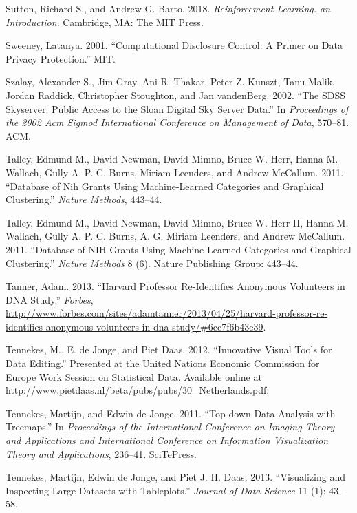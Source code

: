 \documentclass[]{krantz}
\begin{document}
\hypertarget{ref-Sutton2018}{}
Sutton, Richard S., and Andrew G. Barto. 2018. \emph{Reinforcement
Learning. an Introduction}. Cambridge, MA: The MIT Press.

\hypertarget{ref-sweeney2001computational}{}
Sweeney, Latanya. 2001. ``Computational Disclosure Control: A Primer on
Data Privacy Protection.'' MIT.

\hypertarget{ref-szalay2002sdss}{}
Szalay, Alexander S., Jim Gray, Ani R. Thakar, Peter Z. Kunszt, Tanu
Malik, Jordan Raddick, Christopher Stoughton, and Jan vandenBerg. 2002.
``The SDSS Skyserver: Public Access to the Sloan Digital Sky Server
Data.'' In \emph{Proceedings of the 2002 Acm Sigmod International
Conference on Management of Data}, 570--81. ACM.

\hypertarget{ref-EdmundMTalley2011}{}
Talley, Edmund M., David Newman, David Mimno, Bruce W. Herr, Hanna M.
Wallach, Gully A. P. C. Burns, Miriam Leenders, and Andrew McCallum.
2011. ``Database of Nih Grants Using Machine-Learned Categories and
Graphical Clustering.'' \emph{Nature Methods}, 443--44.

\hypertarget{ref-talley2011database}{}
Talley, Edmund M., David Newman, David Mimno, Bruce W. Herr II, Hanna M.
Wallach, Gully A. P. C. Burns, A. G. Miriam Leenders, and Andrew
McCallum. 2011. ``Database of NIH Grants Using Machine-Learned
Categories and Graphical Clustering.'' \emph{Nature Methods} 8 (6).
Nature Publishing Group: 443--44.

\hypertarget{ref-forbesharvard}{}
Tanner, Adam. 2013. ``Harvard Professor Re-Identifies Anonymous
Volunteers in DNA Study.'' \emph{Forbes},
\url{http://www.forbes.com/sites/adamtanner/2013/04/25/harvard-professor-re-identifies-anonymous-volunteers-in-dna-study/\#6cc7f6b43e39}.

\hypertarget{ref-Tennekes2012}{}
Tennekes, M., E. de Jonge, and Piet Daas. 2012. ``Innovative Visual
Tools for Data Editing.'' Presented at the United Nations Economic
Commission for Europe Work Session on Statistical Data. Available online
at \url{http://www.pietdaas.nl/beta/pubs/pubs/30_Netherlands.pdf}.

\hypertarget{ref-tennekes2011top}{}
Tennekes, Martijn, and Edwin de Jonge. 2011. ``Top-down Data Analysis
with Treemaps.'' In \emph{Proceedings of the International Conference on
Imaging Theory and Applications and International Conference on
Information Visualization Theory and Applications}, 236--41. SciTePress.

\hypertarget{ref-tennekes2013visualizing}{}
Tennekes, Martijn, Edwin de Jonge, and Piet J. H. Daas. 2013.
``Visualizing and Inspecting Large Datasets with Tableplots.''
\emph{Journal of Data Science} 11 (1): 43--58.
\end{document}
